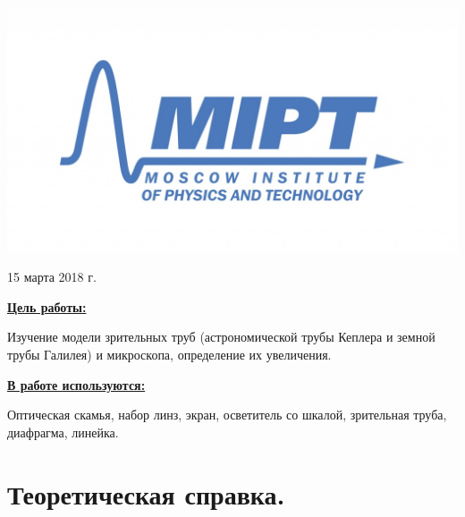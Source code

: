 \documentclass[a4paper, 12pt, twoside]{article}
\newenvironment{bottompar}{\par\vspace*{\fill}}{\clearpage}
\begin{document}
\begin{titlepage}
		\begin{bottompar}
			\begin{center}
				\includegraphics[width = 80 mm]{logo.jpg}
			\end{center}
			{\large 15 марта 2018 г.}
			
		\end{bottompar}
		\vfill %
		
	\end{titlepage}
	
	{\Large \uline { \textbf  {Цель работы:}}}
	
	\vspace{2mm}
	Изучение модели зрительных труб (астрономической трубы Кеплера и земной трубы Галилея) и микроскопа, определение их увеличения.
	\vspace{\baselineskip}
	
	{\Large \uline { \textbf  {В работе используются:}}}
	
	\vspace{2mm}
	
	Оптическая скамья, набор линз, экран, осветитель со шкалой, зрительная труба, диафрагма, линейка.
	
	\section{Теоретическая справка.}
	
	
\end{document}
